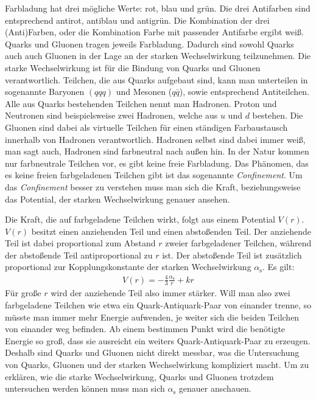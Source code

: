 Farbladung hat drei m\"ogliche \glqq{}Werte\grqq{}: rot, blau und gr\"un.
Die drei Antifarben sind entsprechend antirot, antiblau und antigr\"un.
Die Kombination der drei (Anti)Farben, oder die Kombination Farbe mit passender Antifarbe ergibt wei{\ss}.
Quarks und Gluonen tragen jeweils Farbladung.
Dadurch sind sowohl Quarks auch auch Gluonen in der Lage an der starken Wechselwirkung teilzunehmen.
Die starke Wechselwirkung ist für die Bindung von Quarks und Gluonen verantwortlich.
Teilchen, die aus Quarks aufgebaut sind, kann man unterteilen in sogenannte Baryonen $(qqq)$ und Mesonen ($q\bar{q}$), sowie entsprechend Antiteilchen. Alle aus Quarks bestehenden Teilchen nennt man Hadronen.
Proton und Neutronen sind beispielsweise zwei Hadronen, welche aus $u$ und $d$ bestehen.
Die Gluonen sind dabei als virtuelle Teilchen f\"ur einen st\"andigen Farbaustausch innerhalb von Hadronen verantwortlich.
Hadronen selbst sind dabei immer wei{\ss}, man sagt auch, Hadronen sind farbneutral nach au{\ss}en hin.
In der Natur kommen nur farbneutrale Teilchen vor, es gibt keine freie Farbladung.
Das Ph\"anomen, das es keine freien farbgeladenen Teilchen gibt ist das sogenannte \textit{Confinement}.
Um das \textit{Confinement} besser zu verstehen muss man sich die Kraft, beziehungsweise das Potential, der starken Wechselwirkung genauer ansehen.

Die Kraft, die auf farbgeladene Teilchen wirkt, folgt aus einem Potential $V(r)$.
$V(r)$ besitzt einen anziehenden Teil und einen abstoßenden Teil.
Der anziehende Teil ist dabei proportional zum Abstand $r$ zweier farbgeladener Teilchen, w\"ahrend der absto{\ss}ende Teil antiproportional zu $r$ ist.
Der absto{\ss}ende Teil ist zus\"atzlich proportional zur Kopplungskonstante der starken Wechselwirkung $\alpha_\text{s}$.
Es gilt:
\begin{align} \label{eq:Potential}
V(r) = -\frac{4}{3}\frac{\alpha_\text{s}}{r} + kr
\end{align}
F\"ur gro{\ss}e $r$ wird der anziehende Teil also immer stärker.
Will man also zwei farbgeladene Teilchen wie etwa ein Quark-Antiquark-Paar von einander trenne, so m\"usste man immer mehr Energie aufwenden, je weiter sich die beiden Teilchen von einander weg befinden.
Ab einem bestimmen Punkt wird die ben\"otigte Energie so gro{\ss}, dass sie ausreicht ein weiters Quark-Antiquark-Paar zu erzeugen.
Deshalb sind Quarks und Gluonen nicht direkt messbar, was die Untersuchung von Quarks, Gluonen und der starken Wechselwirkung kompliziert macht.
Um zu erkl\"aren, wie die starke Wechselwirkung, Quarks und Gluonen trotzdem untersuchen werden k\"onnen muss man sich $\alpha_\text{s}$ genauer anschauen. 

